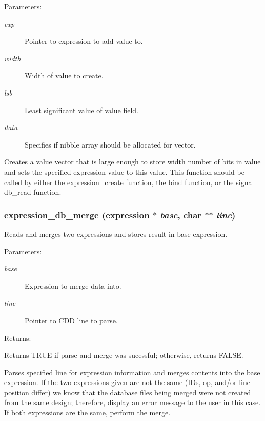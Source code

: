 \begin{Desc}
\item[Parameters: ]\par
\begin{description}
\item[{\em 
exp}]Pointer to expression to add value to. \item[{\em 
width}]Width of value to create. \item[{\em 
lsb}]Least significant value of value field. \item[{\em 
data}]Specifies if nibble array should be allocated for vector.\end{description}
\end{Desc}
Creates a value vector that is large enough to store width number of bits in value and sets the specified expression value to this value. This function should be called by either the expression\_\-create function, the bind function, or the signal db\_\-read function. 
\subsubsection{ expression\_\-db\_\-merge ({\bf expression} $\ast$ {\em base}, char $\ast$$\ast$ {\em line})}\label{expr_8c_a15}


Reads and merges two expressions and stores result in base expression.

\begin{Desc}
\item[Parameters: ]\par
\begin{description}
\item[{\em 
base}]Expression to merge data into. \item[{\em 
line}]Pointer to CDD line to parse.\end{description}
\end{Desc}
\begin{Desc}
\item[Returns: ]\par
Returns TRUE if parse and merge was sucessful; otherwise, returns FALSE.\end{Desc}
Parses specified line for expression information and merges contents into the base expression. If the two expressions given are not the same (IDs, op, and/or line position differ) we know that the database files being merged  were not created from the same design; therefore, display an error message  to the user in this case. If both expressions are the same, perform the  merge. 

